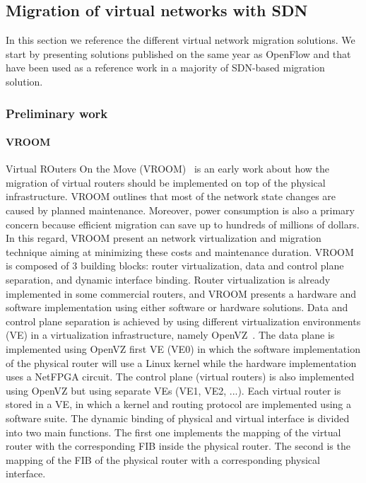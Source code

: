 \subsection{Migration of virtual networks with SDN}
In this section we reference the different virtual network migration solutions.
We start by presenting solutions published on the same year as OpenFlow and that have been used as a reference work in a majority of SDN-based migration solution.

\subsubsection{Preliminary work}

\paragraph{VROOM}
Virtual ROuters On the Move (VROOM)~\cite{VROOM-Wang2008} is an early work about how the migration of virtual routers should be implemented on top of the physical infrastructure. 
VROOM outlines that most of the network state changes are caused by planned maintenance.
Moreover, power consumption is also a primary concern because efficient migration can save up to hundreds of millions of dollars.
In this regard, VROOM present an network virtualization and migration technique aiming at minimizing these costs and maintenance duration.
VROOM is composed of 3 building blocks: router virtualization, data and control plane separation, and dynamic interface binding.
Router virtualization is already implemented in some commercial routers, and VROOM presents a hardware and software implementation using either software or hardware solutions.
Data and control plane separation is achieved by using different virtualization environments (VE) in a virtualization infrastructure, namely OpenVZ~\cite{openvz}.
The data plane is implemented using OpenVZ first VE (VE0) in which the software implementation of the physical router will use a Linux kernel while the hardware implementation uses a NetFPGA circuit.
The control plane (\ie virtual routers) is also implemented using OpenVZ but using separate VEs (VE1, VE2, ...).
Each virtual router is stored in a VE, in which a kernel and routing protocol are implemented using a software suite.
The dynamic binding of physical and virtual interface is divided into two main functions.
The first one implements the mapping of the virtual router with the corresponding FIB inside the physical router.
The second is the mapping of the FIB of the physical router with a corresponding physical interface.

